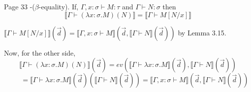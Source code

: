 \begin{problem}{Page 33}
    -($\beta$-equality). If, $\Gamma, x:\sigma \vdash M:\tau$ and $ \Gamma \vdash N:\sigma$ then
$$ \llbracket \Gamma \vdash (\lambda x:\sigma . M)(N) \rrbracket = \llbracket \Gamma \vdash M[N/x] \rrbracket $$
\end{problem}

\begin{solution}
    $ \llbracket \Gamma \vdash M[N/x] \rrbracket (\vec{d}) = \llbracket \Gamma , x: \sigma \vdash M \rrbracket (\vec{d}, \llbracket \Gamma \vdash N \rrbracket (\vec{d})) $ by Lemma 3.15.

Now, for the other side, 
$$  \llbracket \Gamma \vdash (\lambda x : \sigma . M)(N) \rrbracket (\vec{d}) = ev(\llbracket \Gamma \vdash \lambda x:\sigma . M \rrbracket (\vec{d}), \llbracket \Gamma \vdash N \rrbracket (\vec{d}))  $$
$$ \qquad = \llbracket \Gamma \vdash \lambda x:\sigma . M \rrbracket (\vec{d})(\llbracket \Gamma \vdash N \rrbracket (\vec{d})) = \llbracket \Gamma , x:\sigma \vdash M \rrbracket ( \vec{d} , \llbracket \Gamma \vdash N \rrbracket (\vec{d})) $$

\end{solution}
